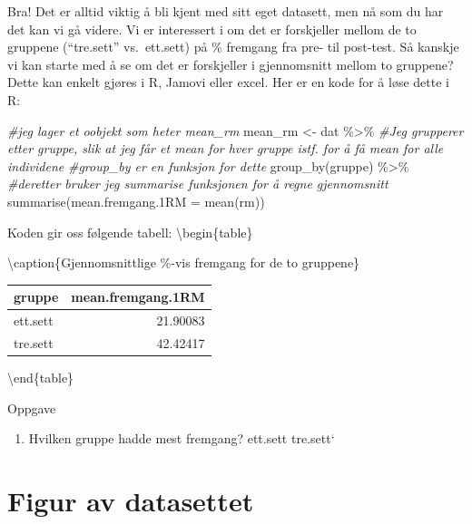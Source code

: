 \documentclass[
]{book}
\newenvironment{Shaded}{\begin{snugshade}}{\end{snugshade}}
\newcommand{\AttributeTok}[1]{\textcolor[rgb]{0.77,0.63,0.00}{#1}}
\newcommand{\CommentTok}[1]{\textcolor[rgb]{0.56,0.35,0.01}{\textit{#1}}}
\newcommand{\FunctionTok}[1]{\textcolor[rgb]{0.00,0.00,0.00}{#1}}
\newcommand{\NormalTok}[1]{#1}
\newcommand{\OtherTok}[1]{\textcolor[rgb]{0.56,0.35,0.01}{#1}}
\newcommand{\SpecialCharTok}[1]{\textcolor[rgb]{0.00,0.00,0.00}{#1}}
\providecommand{\tightlist}{%
  \setlength{\itemsep}{0pt}\setlength{\parskip}{0pt}}
\begin{document}
Bra! Det er alltid viktig å bli kjent med sitt eget datasett, men nå som du har det kan vi gå videre. Vi er interessert i om det er forskjeller mellom de to gruppene (``tre.sett'' vs.~ett.sett) på \% fremgang fra pre- til post-test. Så kanskje vi kan starte med å se om det er forskjeller i gjennomsnitt mellom to gruppene? Dette kan enkelt gjøres i R, Jamovi eller excel. Her er en kode for å løse dette i R:

\begin{Shaded}
\begin{Highlighting}[]
\CommentTok{\#jeg lager et oobjekt som heter mean\_rm }
\NormalTok{mean\_rm }\OtherTok{\textless{}{-}}\NormalTok{ dat }\SpecialCharTok{\%\textgreater{}\%}
  \CommentTok{\#Jeg grupperer etter gruppe, slik at jeg får et mean for hver gruppe istf. for å få mean for alle individene}
  \CommentTok{\#group\_by er en funksjon for dette}
  \FunctionTok{group\_by}\NormalTok{(gruppe) }\SpecialCharTok{\%\textgreater{}\%}
  \CommentTok{\#deretter bruker jeg summarise funksjonen for å regne gjennomsnitt}
  \FunctionTok{summarise}\NormalTok{(}\AttributeTok{mean.fremgang.1RM =} \FunctionTok{mean}\NormalTok{(rm))}
\end{Highlighting}
\end{Shaded}

Koden gir oss følgende tabell:
\textbackslash begin\{table\}

\textbackslash caption\{\label{tab:unnamed-chunk-6}Gjennomsnittlige \%-vis fremgang for de to gruppene\}
\centering

\begin{tabular}[t]{lr}
\toprule
gruppe & mean.fremgang.1RM\\
\midrule
ett.sett & 21.90083\\
tre.sett & 42.42417\\
\bottomrule
\end{tabular}

\textbackslash end\{table\}

{Oppgave}

\begin{enumerate}
\def\labelenumi{\alph{enumi})}
\setcounter{enumi}{3}
\tightlist
\item
  Hvilken gruppe hadde mest fremgang?
  ett.sett tre.sett`
\end{enumerate}

\hypertarget{figur-av-datasettet}{%
\section{Figur av datasettet}\label{figur-av-datasettet}}
\end{document}
